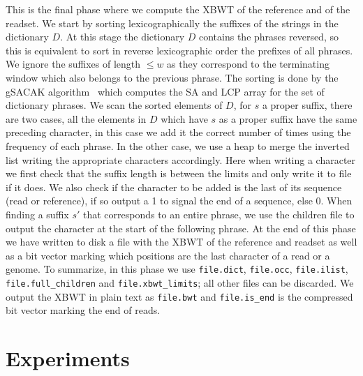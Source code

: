 This is the final phase where we compute the XBWT of the reference and of the readset. We start by sorting lexicographically the suffixes of the strings in the dictionary $D$. At this stage the dictionary $D$ contains the phrases reversed, so this is equivalent to sort in reverse lexicographic order the prefixes of all phrases. We ignore the suffixes of length $\leq w$ as they correspond to the terminating window which also belongs to the previous phrase.  The sorting is done by the gSACAK algorithm~\cite{LOUZA201722} which computes the SA and LCP array for the set of dictionary phrases. We scan the sorted elements of $D$, for $s$ a proper suffix, there are two cases, all the elements in $D$ which have $s$ as a proper suffix have the same preceding character, in this case we add it the correct number of times using the frequency of each phrase. In the other case, we use a heap to merge the inverted list writing the appropriate characters accordingly. Here when writing a character we first check that the suffix length is between the limits and only write it to file if it does. We also check if the character to be added is the last of its sequence (read or reference), if so output a 1 to signal the end of a sequence, else 0. When finding a suffix $s'$ that corresponds to an entire phrase, we use the children file to output the character at the start of the following phrase. At the end of this phase we have written to disk a file with the XBWT of the reference and readset as well as a bit vector marking which positions are the last character of a read or a genome. To summarize, in this phase we use \texttt{file.dict}, \texttt{file.occ}, \texttt{file.ilist}, \texttt{file.full\_children} and \texttt{file.xbwt\_limits}; all other files can be discarded. We output the XBWT in plain text as \texttt{file.bwt} and \texttt{file.is\_end} is the compressed bit vector marking the end of reads.



\section{Experiments} \label{xbwt:sec:practice}

